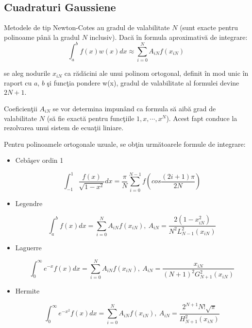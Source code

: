 \documentclass{exam}
\begin{document}
\subsection{Cuadraturi Gaussiene}

Metodele de tip Newton-Cotes au gradul de valabilitate $N$ (sunt exacte pentru polinoame p\^{a}n\u{a} la gradul $N$ inclusiv). Dacă \^{i}n formula aproximativ\u{a} de integrare:
$$ \displaystyle \int_a^b f\left(x\right) w\left(x\right) dx  \approx \sum_{i = 0}^N A_{iN} f\left(x_{iN}\right) $$

\noindent se aleg nodurile $ x_{iN} $ ca r\u{a}d\u{a}cini ale unui polinom ortogonal, definit în mod unic în raport cu $a$, $b$ \c{s}i funcţia pondere w(x),
gradul de valabilitate al formulei devine $ 2N + 1 $.

Coeficien\c{t}ii $ A_{iN} $ se vor determina impun\^{a}nd ca formula s\u{a} aib\u{a} grad de valabilitate $N$ (s\u{a} fie exact\u{a} pentru func\c{t}iile $ 1, x, \cdots, x^N $).
Acest fapt conduce la rezolvarea unui sistem de ecua\c{t}ii liniare.

Pentru polinoamele ortogonale uzuale, se ob\c{t}in urm\u{a}toarele formule de integrare:

\begin{itemize}
	\item Ceb\^{a}\c{s}ev ordin 1

	      $$ \displaystyle \int_{-1}^1 \frac{f\left(x\right)}{\sqrt{1 - x^2}} dx = \frac{\pi}{N} \sum_{i = 0}^{N-1} f\left(cos \frac{\left(2i + 1\right) \pi}{2N}\right) $$

	\item Legendre

	      $$ \displaystyle \int_a^b f\left(x\right) dx  = \sum_{i = 0}^N A_{iN} f\left(x_{iN}\right), \  A_{iN} = \frac{2\left(1 - x_{iN}^2\right)}{N^2 L_{N - 1}^2\left(x_{iN}\right)} $$

	\item Laguerre

	      $$ \displaystyle \int_0^\infty e^{-x} f\left(x\right) dx  = \sum_{i = 0}^N A_{iN} f\left(x_{iN}\right), \  A_{iN} = \frac{x_{iN}}{\left(N + 1\right)^2 G_{N + 1}^2\left(x_{iN}\right)} $$

	\item Hermite

	      $$ \displaystyle \int_0^\infty e^{-x^2} f\left(x\right) dx  = \sum_{i = 0}^N A_{iN} f\left(x_{iN}\right), \  A_{iN} = \frac{2^{N + 1}N!\sqrt{\pi}}{H_{N + 1}^2\left(x_{iN}\right)} $$

\end{itemize}
\end{document}

